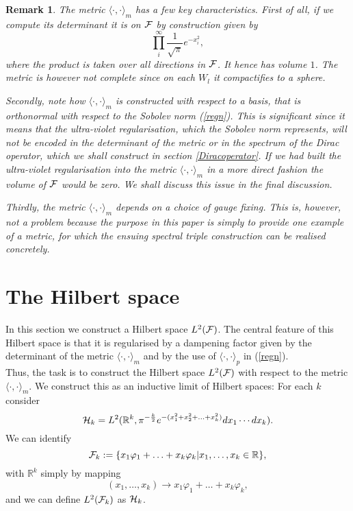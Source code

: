 \documentclass[letterpaper,12pt]{article}
\def\cf{{\cal F}}
\def\ch{{\cal H}}
\newtheorem{remark}{Remark}
\newcommand{\cF}{{\cal F}}
\newcommand{\R}{\mathbb{ R}}
\begin{document}
\begin{remark}
The metric $\langle \cdot ,\cdot \rangle_m$ has a few key characteristics. First of all, if we compute its determinant it is on $\cf$ by construction given by 
$$\prod_i^\infty \frac{1}{\sqrt{\pi}}e^{-x_i^2} ,$$
where the product is taken over all directions in $\cf$. It hence has volume $1$. The metric is however not complete since on each $W_l$ it compactifies to a sphere.  

Secondly, note how $\langle \cdot ,\cdot \rangle_m$ is constructed with respect to a basis, that is orthonormal with respect to the Sobolev norm (\ref{regn}). This is significant since it means that the ultra-violet regularisation, which the Sobolev norm represents, will not be encoded in the determinant of the metric or in the spectrum of the Dirac operator, which we shall construct in section \ref{Diracoperator}. If we had built the ultra-violet regularisation into the metric $\langle \cdot ,\cdot \rangle_m$ in a more direct fashion the volume of $\cf$ would be zero. We shall discuss this issue in the final discussion.



Thirdly, the metric $\langle \cdot ,\cdot \rangle_m$ depends on a choice of gauge fixing. This is, however, not a problem because the purpose in this paper is simply to provide one example of a metric, for which the ensuing spectral triple construction can be realised concretely. 
\end{remark}




\section{The Hilbert space}

In this section we construct a Hilbert space $L^2(\cf)$. The central feature of this Hilbert space is that it is regularised by a dampening factor given by the determinant of the metric $\langle \cdot    , \cdot  \rangle_m$ and by the use of $\langle \cdot , \cdot \rangle_p$ in (\ref{regn}).\\



Thus, the task is to construct the Hilbert space $L^2(\cF)$ with respect to the metric $\langle \cdot ,\cdot \rangle_m$. We construct this as an inductive limit of Hilbert spaces: For each $k$ consider 
$$\ch_k=L^2(\R^k,\pi^{-\frac{k}{2}}e^{-(x_1^2+x_2^2+\ldots +x_k^2)}dx_1\cdots dx_k).$$
We can identify 
$$\cF_k:=\{x_1\varphi_1+\ldots + x_k\varphi_k| x_1,\ldots ,x_k\in \R\},$$
with $\R^k$ simply by mapping 
$$(x_1,\ldots , x_k) \to  x_1\varphi_1+\ldots + x_k\varphi_k ,$$
and we can define $L^2(\cF_k)$ as $\ch_k$. 
\end{document}
